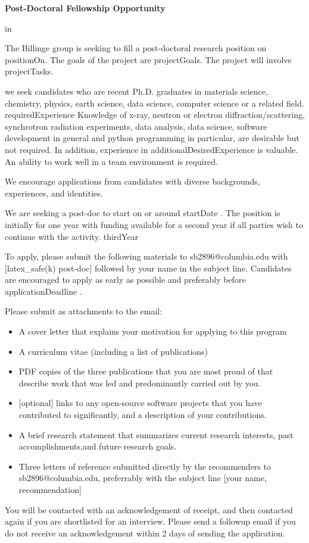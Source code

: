 \documentclass{letter}
\begin{document}
\begin{center}
 {\bf
  Post-Doctoral Fellowship Opportunity
 }
\end{center}
 in

The Billinge group is seeking to fill a post-doctoral research position on {{positionOn}}.
The goals of the project are {{projectGoals}}.
The project will involve {{projectTasks}}.

we seek candidates who are recent Ph.D. graduates in materials science, chemistry, physics, earth science, data science, computer science or a related field. {{requiredExperience}} Knowledge of x-ray, neutron or electron diffraction/scattering,
synchrotron radiation experiments, data analysis, data science, software development in
general and python programming in particular, are desirable but not required. In addition, experience in {{additionalDesiredExperience}} is valuable.  An ability to work well in a team environment is required.

We encourage applications from candidates with diverse backgrounds, experiences, and identities.


We are seeking a post-doc to start on or around {{ startDate }}.  The position is initially for one year with funding available for a second year if all parties wish to continue with the activity.  {{thirdYear}}


To apply, please submit the following materials to sb2896@columbia.edu with [{{latex_safe(k)}} post-doc] followed by your name in the subject line.  Candidates are encouraged to apply as early as possible and preferably before {{ applicationDeadline }}.

Please submit as attachments to the email:
\begin{itemize}
\item A cover letter that explains your motivation for applying to this program
\item A curriculum vitae (including a list of publications)
\item PDF copies of the three publications that you are most proud of that describe work that was led and predominantly carried out by you.
\item {[optional]} links to any open-source software projects that you have contributed to significantly, and a description of your contributions.
\item A brief research statement that summarizes current research interests, past accomplishments,and future research goals.
\item Three letters of reference submitted directly by the recommenders to sb2896@columbia.edu, preferrably with the subject line [your name, recommendation]
\end{itemize}

You will be contacted with an acknowledgement of receipt, and then contacted again if you are shortlisted for an interview.  Please send a followup email if you do not receive an acknowledgement within 2 days of sending the application.
\end{document}
